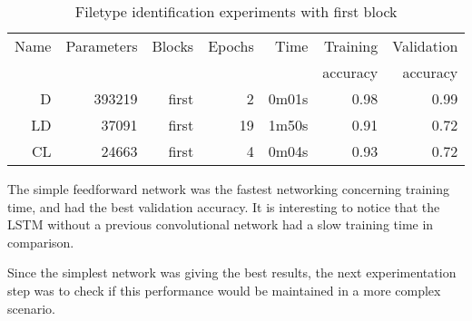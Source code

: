 \begin{table}[!ht]
    \centering
    \caption{Filetype identification experiments with first block}
    \label{tab:carving7-11}
\begin{tabular}{r|r|r|r|r|r|r}
\hline
Name & Parameters & Blocks & Epochs & Time    & Training          & Validation          \\       
     &            &        &        &         &          accuracy &            accuracy \\ \hline\hline

D    & 393219     & first  & 2      & 0m01s   & 0.98              & 0.99                \\ \hline
LD   & 37091      & first  & 19     & 1m50s   & 0.91              & 0.72                \\ \hline
CL   & 24663      & first  & 4      & 0m04s   & 0.93              & 0.72                \\ \hline
\end{tabular}
\end{table}

The simple feedforward network was the fastest networking concerning training time, and had the best validation accuracy. It is interesting to notice that the LSTM without a previous convolutional network had a slow training time in comparison.

Since the simplest network was giving the best results, the next experimentation step was to check if this performance would be maintained in a more complex scenario.

